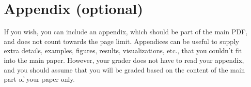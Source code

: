 \documentclass[11pt]{article}
\begin{document}



\appendix

\section{Appendix (optional)}\label{sec:appendix}
If you wish, you can include an appendix, which should be part of the main PDF, and does not count towards the page limit. Appendices can be useful to supply extra details, examples, figures, results, visualizations, etc., that you couldn’t fit into the main paper. However, your grader does not have to read your appendix, and you should assume that you will be graded based on the content of the main part of your paper only.
\end{document}
